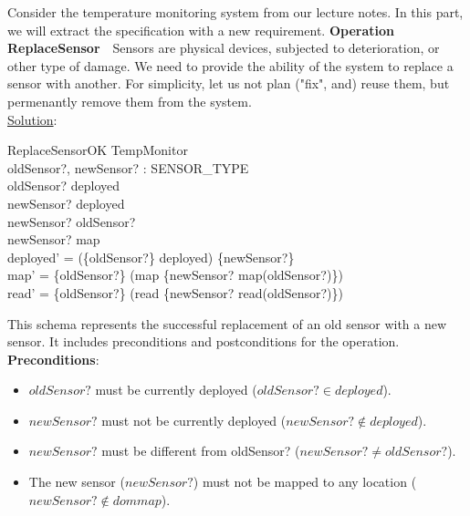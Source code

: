 \documentclass[12pt]{article}
\begin{document}
\begin{spacing}{1.5}
	Consider the temperature monitoring system from our lecture notes. In this part, we will extract the specification with a new requirement.
	\newline \newline
	\textbf{Operation ReplaceSensor}~~Sensors are physical devices, subjected to deterioration, or other type of damage. We need to provide the ability of the system to replace a sensor with another. For simplicity, let us not plan ("fix", and) reuse them, but permenantly remove them from the system.\\
	
	\noindent \underline{Solution}:
	
	\begin{schema}{ReplaceSensorOK}
		\Delta TempMonitor \\
		oldSensor?, newSensor? : SENSOR\_TYPE \\
		\where
		oldSensor? \in deployed \\
		newSensor? \notin deployed \\
		newSensor? \neq oldSensor? \\
		newSensor? \notin \dom map \\
		deployed' = (\{oldSensor?\} \dsub deployed) \cup \{newSensor?\} \\
		map' = \{oldSensor?\} \dsub (map \oplus \{newSensor? \mapsto map(oldSensor?)\}) \\
		read' = \{oldSensor?\} \dsub (read \oplus \{newSensor? \mapsto read(oldSensor?)\})
	\end{schema}
	
	This schema represents the successful replacement of an old sensor with a new sensor. It includes preconditions and postconditions for the operation.\\
	
	\textbf{Preconditions}:
	\begin{itemize}
		\item $oldSensor?$ must be currently deployed ($oldSensor? \in deployed$).
		\item $newSensor?$ must not be currently deployed ($newSensor? \notin deployed$).
		\item $newSensor?$ must be different from oldSensor? ($newSensor? \neq oldSensor?$).
		\item The new sensor ($newSensor?$) must not be mapped to any location ($newSensor? \notin dom map$).
	\end{itemize}
	

\end{spacing}
\end{document}
